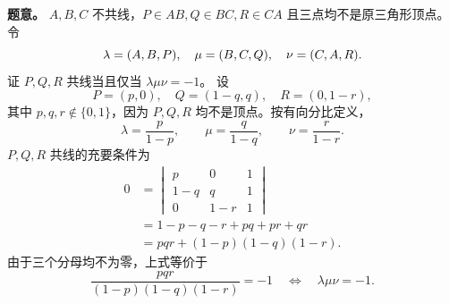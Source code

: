 \textbf{题意。} $A,B,C$ 不共线，$P\in AB,Q\in BC,R\in CA$ 且三点均不是原三角形顶点。令
\[
\lambda=(A,B,P),\quad\mu=(B,C,Q),\quad\nu=(C,A,R).
\]
证 $P,Q,R$ 共线当且仅当 $\lambda\mu\nu=-1$。
设
\[
P=(p,0),\quad Q=(1-q,q),\quad R=(0,1-r),
\]
其中 $p,q,r\notin\{0,1\}$，因为 $P,Q,R$ 均不是顶点。按有向分比定义，
\[
\lambda=\frac p{1-p},\qquad\mu=\frac q{1-q},\qquad\nu=\frac r{1-r}.
\]
$P,Q,R$ 共线的充要条件为
\begin{align*}
0&=\begin{vmatrix}p&0&1\\1-q&q&1\\0&1-r&1\end{vmatrix}\\
&=1-p-q-r+pq+pr+qr\\
&=pqr+(1-p)(1-q)(1-r).
\end{align*}
由于三个分母均不为零，上式等价于
\[
\frac{pqr}{(1-p)(1-q)(1-r)}=-1
\quad\Longleftrightarrow\quad\boxed{\lambda\mu\nu=-1}.
\]

